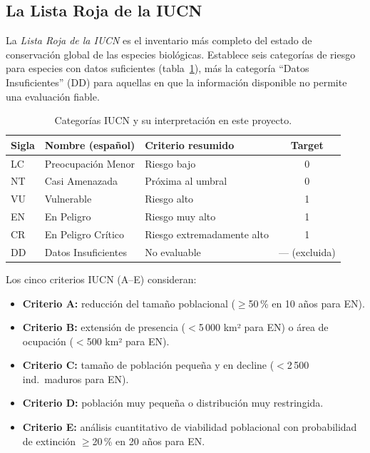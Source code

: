 \documentclass[12pt,a4paper]{article}
\begin{document}
\subsection{La Lista Roja de la IUCN}

La \textit{Lista Roja de la IUCN} es el inventario más completo del estado de conservación global
de las especies biológicas.  Establece seis categorías de riesgo para especies con datos
suficientes (tabla~\ref{tab:iucn}), más la categoría ``Datos Insuficientes'' (DD) para aquellas
en que la información disponible no permite una evaluación fiable.

\begin{table}[H]
  \centering
  \caption{Categorías IUCN y su interpretación en este proyecto.}
  \label{tab:iucn}
  \begin{tabular}{lllc}
    \toprule
    \textbf{Sigla} & \textbf{Nombre (español)} & \textbf{Criterio resumido} & \textbf{Target} \\
    \midrule
    LC & Preocupación Menor      & Riesgo bajo            & 0 \\
    NT & Casi Amenazada          & Próxima al umbral      & 0 \\
    VU & Vulnerable              & Riesgo alto            & 1 \\
    EN & En Peligro              & Riesgo muy alto        & 1 \\
    CR & En Peligro Crítico      & Riesgo extremadamente alto & 1 \\
    DD & Datos Insuficientes     & No evaluable           & --- (excluida) \\
    \bottomrule
  \end{tabular}
\end{table}

Los cinco criterios IUCN (A--E) consideran:
\begin{itemize}[nosep]
  \item \textbf{Criterio A:} reducción del tamaño poblacional ($\geq$50\,\% en 10 años para EN).
  \item \textbf{Criterio B:} extensión de presencia ($<$5\,000 km² para EN) o área de ocupación
        ($<$500 km² para EN).
  \item \textbf{Criterio C:} tamaño de población pequeña y en decline ($<$2\,500 ind.\ maduros
        para EN).
  \item \textbf{Criterio D:} población muy pequeña o distribución muy restringida.
  \item \textbf{Criterio E:} análisis cuantitativo de viabilidad poblacional con probabilidad
        de extinción $\geq$20\,\% en 20 años para EN.
\end{itemize}
\end{document}
